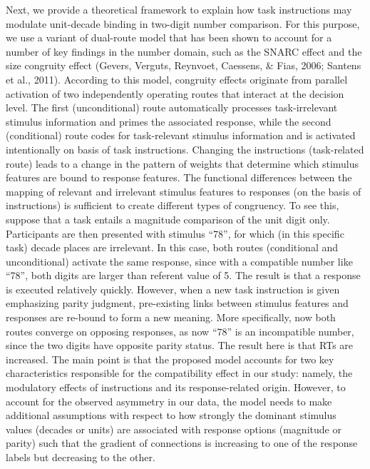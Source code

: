 \documentclass[english,man]{apa6}
\theoremstyle{definition}
\theoremstyle{definition}
\theoremstyle{definition}
\theoremstyle{remark}
\begin{document}
Next, we provide a theoretical framework to explain how task
instructions may modulate unit-decade binding in two-digit number
comparison. For this purpose, we use a variant of dual-route model that
has been shown to account for a number of key findings in the number
domain, such as the SNARC effect and the size congruity effect (Gevers,
Verguts, Reynvoet, Caessens, \& Fias, 2006; Santens et al., 2011).
According to this model, congruity effects originate from parallel
activation of two independently operating routes that interact at the
decision level. The first (unconditional) route automatically processes
task-irrelevant stimulus information and primes the associated response,
while the second (conditional) route codes for task-relevant stimulus
information and is activated intentionally on basis of task
instructions. Changing the instructions (task-related route) leads to a
change in the pattern of weights that determine which stimulus features
are bound to response features. The functional differences between the
mapping of relevant and irrelevant stimulus features to responses (on
the basis of instructions) is sufficient to create different types of
congruency. To see this, suppose that a task entails a magnitude
comparison of the unit digit only. Participants are then presented with
stimulus \enquote{78}, for which (in this specific task) decade places
are irrelevant. In this case, both routes (conditional and
unconditional) activate the same response, since with a compatible
number like \enquote{78}, both digits are larger than referent value of
5. The result is that a response is executed relatively quickly.
However, when a new task instruction is given emphasizing parity
judgment, pre-existing links between stimulus features and responses are
re-bound to form a new meaning. More specifically, now both routes
converge on opposing responses, as now \enquote{78} is an incompatible
number, since the two digits have opposite parity status. The result
here is that RTs are increased. The main point is that the proposed
model accounts for two key characteristics responsible for the
compatibility effect in our study: namely, the modulatory effects of
instructions and its response-related origin. However, to account for
the observed asymmetry in our data, the model needs to make additional
assumptions with respect to how strongly the dominant stimulus values
(decades or units) are associated with response options (magnitude or
parity) such that the gradient of connections is increasing to one of
the response labels but decreasing to the other.
\end{document}
